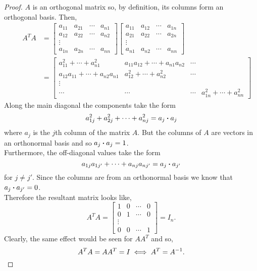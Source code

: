 \documentclass[../MathsNotesBase.tex]{subfiles}
\begin{document}
{		\medskip
		\begin{proof}
			$A$ is an orthogonal matrix so, by definition, its columns form an orthogonal basis. Then,
			\begin{align*}
			&& A^TA &=
					\begin{bmatrix}
						a_{11} & a_{21} & \cdots & a_{n1}\\
						a_{12} & a_{22} & \cdots & a_{n2}\\
						\vdots \\
						a_{1n} & a_{2n} & \cdots & a_{nn}
					\end{bmatrix}
					\begin{bmatrix}
						a_{11} & a_{12} & \cdots & a_{1n}\\
						a_{21} & a_{22} & \cdots & a_{2n}\\
						\vdots \\
						a_{n1} & a_{n2} & \cdots & a_{nn}
					\end{bmatrix} \\
			&&  &= \begin{bmatrix}
						a_{11}^2 + \cdots + a_{n1}^2 & a_{11}a_{12} + \cdots + a_{n1}a_{n2} & \cdots\\
						a_{12}a_{11} + \cdots + a_{n2}a_{n1} & a_{12}^2 + \cdots + a_{n2}^2 & \cdots\\
						\vdots \\
						\cdots & \cdots & \cdots & a_{1n}^2 + \cdots + a_{nn}^2
					\end{bmatrix}
			\end{align*}
			Along the main diagonal the components take the form
			\[ a_{1j}^2 + a_{2j}^2 + \cdots + a_{nj}^2 = a_j \boldsymbol{\cdot} a_j \]
			where ${ a_j }$ is the $j$th column of the matrix $A$. But the columns of $A$ are vectors in an orthonormal basis and so ${ a_j \boldsymbol{\cdot} a_j= 1 }$.\\
			Furthermore, the off-diagonal values take the form
			\[ a_{1j}a_{1j'} + \cdots + a_{nj}a_{nj'} = a_j \boldsymbol{\cdot} a_{j'} \]
			for ${ j \neq j' }$. Since the columns are from an orthonormal basis we know that ${ a_j \boldsymbol{\cdot} a_{j'} = 0 }$.\\
			Therefore the resultant matrix looks like,
			\[ A^TA = \begin{bmatrix}
						1 & 0 & \cdots & 0\\
						0 & 1 & \cdots & 0\\
						\vdots\\
						0 & 0 & \cdots & 1
					  \end{bmatrix}
					  = I_n.
			\]
			Clearly, the same effect would be seen for ${ AA^T }$ and so,
			\[ A^TA = AA^T = I \iff A^T = {A}^{-1}. \]
			

\end{proof}}
\end{document}
